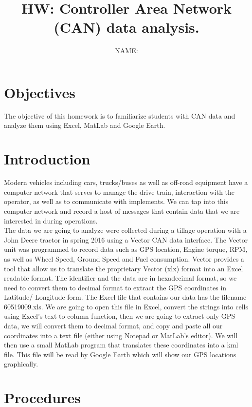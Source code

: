 \documentclass[12pt,letterpaper]{article}
\author{NAME:}
\title{HW: Controller Area Network (CAN) data analysis.}
\begin{document}
\maketitle

\section{Objectives}
The objective of this homework is to familiarize students with CAN data and analyze them using Excel, MatLab and Google Earth. 

\section{Introduction}
Modern vehicles including cars, trucks/buses as well as off-road equipment have a computer network that serves to manage the drive train, interaction with the operator, as well as to communicate with implements. We can tap into this computer network and record a host of messages that contain data that we are interested in during operations.\\

The data we are going to analyze were collected during a tillage operation with a John Deere tractor in spring 2016 using a Vector CAN data interface. The Vector unit was programmed to record data such as GPS location, Engine torque, RPM, as well as Wheel Speed, Ground Speed and Fuel consumption. Vector provides a tool that allow us to translate the proprietary Vector (xlx) format into an Excel readable format. The identifier and the data are in hexadecimal format, so we need to convert them to decimal format to extract the GPS coordinates in Latitude/ Longitude form. The Excel file that contains our data has the filename 60519009.xls. We are going to open this file in Excel, convert the strings into cells using Excel's text to column function, then we are going to extract only GPS data, we will convert them to decimal format, and copy and paste all our coordinates into a text file (either using Notepad or MatLab's editor). We will then use a small MatLab program that translates these coordinates into a kml file. This file will be read by Google Earth which will show our GPS locations graphically.\\

\section{Procedures}
\end{document}
